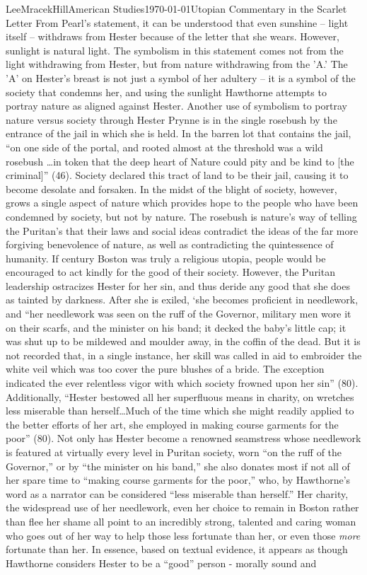 \documentclass[12pt, letterpaper]{article}
\begin{document}
\begin{mla}{Lee}{Mracek}{Hill}{American Studies}{\today}{Utopian Commentary in the Scarlet Letter}
        From Pearl's statement, it can be understood that even sunshine -- light itself -- withdraws from Hester because of the letter that she wears. However, sunlight is natural light. The symbolism in this statement comes not from the light withdrawing from Hester, but from nature withdrawing from the 'A.' The 'A' on Hester's breast is not just a symbol of her adultery -- it is a symbol of the society that condemns her, and using the sunlight Hawthorne attempts to portray nature as aligned against Hester. Another use of symbolism to portray nature versus society through Hester Prynne is in the single rosebush by the entrance of the jail in which she is held. In the barren lot that contains the jail, ``on one side of the portal, and rooted almost at the threshold was a wild rosebush \ldots in token that the deep heart of Nature could pity and be kind to [the criminal]'' (46). Society declared this tract of land to be their jail, causing it to become desolate and forsaken. In the midst of the blight of society, however, grows a single aspect of nature which provides hope to the people who have been condemned by society, but not by nature. The rosebush is nature's way of telling the Puritan's that their laws and social ideas contradict the ideas of the far more forgiving benevolence of nature, as well as contradicting the quintessence of humanity. If  century Boston was truly a religious utopia, people would be encouraged to act kindly for the good of their society. However, the Puritan leadership ostracizes Hester for her sin, and thus deride any good that she does as tainted by darkness. After she is exiled, `she becomes proficient in needlework, and ``her needlework was seen on the ruff of the Governor, military men wore it on their scarfs, and the minister on his band; it decked the baby's little cap; it was shut up to be mildewed and moulder away, in the coffin of the dead. But it is not recorded that, in a single instance, her skill was called in aid to embroider the white veil which was too cover the pure blushes of a bride. The exception indicated the ever relentless vigor with which society frowned upon her sin'' (80). Additionally, ``Hester bestowed all her superfluous means in charity, on wretches less miserable than herself\ldots Much of the time which she might readily applied to the better efforts of her art, she employed in making course garments for the poor'' (80). Not only has Hester become a renowned seamstress whose needlework is featured at virtually every level in Puritan society, worn ``on the ruff of the Governor,'' or by ``the minister on his band,'' she also donates most if not all of her spare time to ``making course garments for the poor,'' who, by Hawthorne's word as a narrator can be considered ``less miserable than herself.'' Her charity, the widespread use of her needlework, even her choice to remain in Boston rather than flee her shame all point to an incredibly strong, talented and caring woman who goes out of her way to help those less fortunate than her, or even those \textit{more} fortunate than her. In essence, based on textual evidence, it appears as though Hawthorne considers Hester to be a ``good'' person - morally sound and 
\end{mla}
\end{document}
